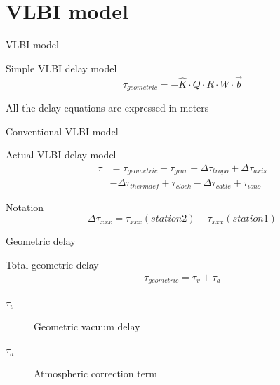 \documentclass[14pt,table,t, c]{beamer}
\begin{document}
\part{VLBI model}

\begin{frame}{VLBI model}

\begin{block}{Simple VLBI delay model}
\vspace{-\baselineskip}\setlength\belowdisplayshortskip{0pt}
\begin{equation*}
\tau_{geometric} = - \hat{K} \cdot Q \cdot R \cdot W \cdot \vec{b} 
\end{equation*}
\end{block}
\vspace*{2em}
All the delay equations are expressed in meters
\end{frame}

\begin{frame}{Conventional VLBI model}
\begin{block}{Actual VLBI delay model}
\vspace*{-\baselineskip}\setlength\belowdisplayskip{0pt}\setlength\abovedisplayskip{0pt}
\begin{align*}
\tau &= \tau _{geometric} + \tau _{grav} + \Delta\tau _{tropo} + \Delta\tau _{axis} \\
     &- \Delta\tau _{thermdef} + \tau _{clock} - \Delta\tau _{cable} + \tau _{iono}
\end{align*}
\end{block}

\begin{block}{Notation}
\vspace*{-\baselineskip}\setlength\belowdisplayshortskip{0pt}
\begin{equation*}
\Delta\tau_{xxx} = \tau_{xxx}(station2) - \tau_{xxx}(station1)
\end{equation*}
\end{block}
\end{frame}


\begin{frame}{Geometric delay}
\begin{block}{Total geometric delay}
\vspace*{-\baselineskip}\setlength\belowdisplayskip{0pt}\setlength\abovedisplayskip{0pt}
\begin{align*}
\tau_{geometric} = \tau_{v} + \tau_{a}
\end{align*}
\end{block}
\begin{description}
\item[$\tau_{v}$] Geometric vacuum delay
\item[$\tau_{a}$] Atmospheric correction term
\end{description}
\end{frame}
\end{document}
